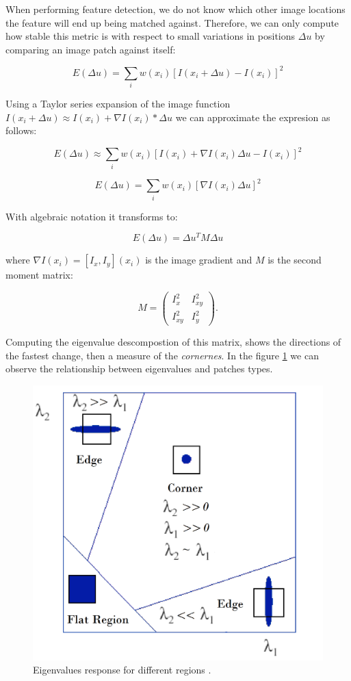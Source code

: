 \documentclass[12pt, a4paper, titlepage,twoside,openright]{article}
\begin{document}

When performing feature detection, we do not know which other image locations the feature will end up being matched against. Therefore, we can only compute how stable this metric is with respect to small variations in positions $\Delta u$ by comparing an image patch against itself:

$$ E( \Delta u) = \sum_{i} w(x_{i}) [I(x_{i}+\Delta u)-I(x_{i})]^{2}$$

Using a Taylor series expansion of the image function $I(x_{i}+\Delta u) \approx I(x_{i}) + \nabla I(x_{i})*\Delta u  $ we can approximate the expresion as follows:

$$ E( \Delta u) \approx \sum_{i} w(x_{i}) [I(x_{i})+\nabla I(x_{i}) \Delta u-I(x_{i})]^{2}$$


$$ E( \Delta u) = \sum_{i} w(x_{i}) [\nabla I(x_{i}) \Delta u]^{2}$$

With algebraic notation it transforms to:

$$ E( \Delta u) = \Delta u^{T} M \Delta u$$

where $ \nabla I(x_{i}) = [I_{x},I_{y}](x_{i}) $ is the image gradient and $M$ is the second moment matrix:

\[ M = \left( \begin{array}{ccc}
I_{x}^{2} & I_{xy}^{2} \\
I_{xy}^{2} & I_{y}^{2} \end{array} \right).\] 

Computing the eigenvalue descompostion of this matrix, shows the directions of the fastest change, then a measure of the \textit{cornernes}. In the figure \ref{corner} we can observe the relationship between eigenvalues and patches types.




\begin{figure}[H]
\centering         
\includegraphics[width=0.6\linewidth]{lucasKanade/harrisMillora.png}
\caption{Eigenvalues response for different regions .} \label{corner}
\end{figure}
\end{document}
